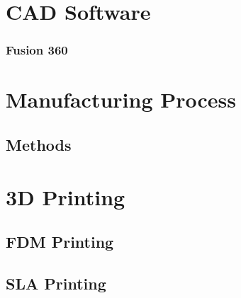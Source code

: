 \section{CAD Software}

\subsubsection{Fusion 360}

\section{Manufacturing Process}

\subsection{Methods}

\section{3D Printing}

\subsection{FDM Printing}

\subsection{SLA Printing}
